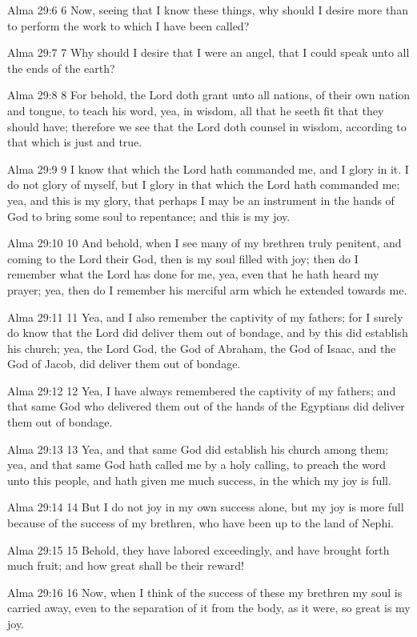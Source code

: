 Alma 29:6
 6 Now, seeing that I know these things, why should I desire more
than to perform the work to which I have been called?

Alma 29:7
 7 Why should I desire that I were an angel, that I could speak
unto all the ends of the earth?

Alma 29:8
 8 For behold, the Lord doth grant unto all nations, of their own
nation and tongue, to teach his word, yea, in wisdom, all that he
seeth fit that they should have; therefore we see that the Lord
doth counsel in wisdom, according to that which is just and true.

Alma 29:9
 9 I know that which the Lord hath commanded me, and I glory in
it. I do not glory of myself, but I glory in that which the Lord
hath commanded me; yea, and this is my glory, that perhaps I may
be an instrument in the hands of God to bring some soul to
repentance; and this is my joy.

Alma 29:10
 10 And behold, when I see many of my brethren truly penitent,
and coming to the Lord their God, then is my soul filled with
joy; then do I remember what the Lord has done for me, yea, even
that he hath heard my prayer; yea, then do I remember his
merciful arm which he extended towards me.

Alma 29:11
 11 Yea, and I also remember the captivity of my fathers; for I
surely do know that the Lord did deliver them out of bondage, and
by this did establish his church; yea, the Lord God, the God of
Abraham, the God of Isaac, and the God of Jacob, did deliver them
out of bondage.

Alma 29:12
 12 Yea, I have always remembered the captivity of my fathers;
and that same God who delivered them out of the hands of the
Egyptians did deliver them out of bondage.

Alma 29:13
 13 Yea, and that same God did establish his church among them;
yea, and that same God hath called me by a holy calling, to
preach the word unto this people, and hath given me much success,
in the which my joy is full.

Alma 29:14
 14 But I do not joy in my own success alone, but my joy is more
full because of the success of my brethren, who have been up to
the land of Nephi.

Alma 29:15
 15 Behold, they have labored exceedingly, and have brought forth
much fruit; and how great shall be their reward!

Alma 29:16
 16 Now, when I think of the success of these my brethren my soul
is carried away, even to the separation of it from the body, as
it were, so great is my joy.

